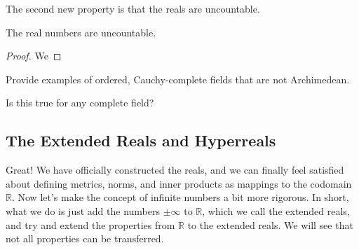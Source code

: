 \documentclass{article}
\begin{document}
      The second new property is that the reals are uncountable. 

      \begin{theorem}
        The real numbers are uncountable. 
      \end{theorem} 
      \begin{proof}
        We 
      \end{proof}

      Provide examples of ordered, Cauchy-complete fields that are not Archimedean. 

      \begin{theorem}
        Is this true for any complete field? 
      \end{theorem}

      \begin{theorem}[Denseness]
        
      \end{theorem}
   
  \subsection{The Extended Reals and Hyperreals}

    Great! We have officially constructed the reals, and we can finally feel satisfied about defining metrics, norms, and inner products as mappings to the codomain $\mathbb{R}$. Now let's make the concept of infinite numbers a bit more rigorous. In short, what we do is just add the numbers $\pm \infty$ to $\mathbb{R}$, which we call the extended reals, and try and extend the properties from $\mathbb{R}$ to the extended reals. We will see that not all properties can be transferred. 
\end{document}
